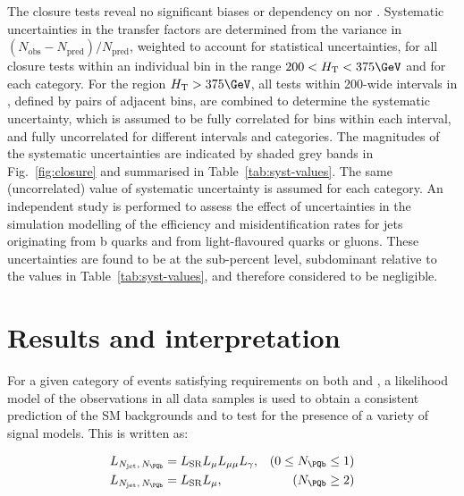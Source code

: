 The closure tests reveal no significant biases or dependency on \njet
nor \scalht. Systematic uncertainties in the transfer factors are
determined from the variance in $(N_\text{obs} -
N_\text{pred})/N_\text{pred}$, weighted to account for statistical
uncertainties, for all closure tests within an individual \scalht bin
in the range $200 < \scalht < 375\GeV$ and for each \njet
category. For the region $\scalht > 375\GeV$, all tests within
200\GeV-wide intervals in \scalht, defined by pairs of adjacent bins,
are combined to determine the systematic uncertainty, which is assumed
to be fully correlated for bins within each interval, and fully
uncorrelated for different \scalht intervals and \njet categories. The
magnitudes of the systematic uncertainties are indicated by shaded
grey bands in Fig.~\ref{fig:closure} and summarised in
Table~\ref{tab:syst-values}. The same (uncorrelated) value of
systematic uncertainty is assumed for each \nb category. An
independent study is performed to assess the effect of uncertainties
in the simulation modelling of the efficiency and misidentification
rates for jets originating from b quarks and from light-flavoured
quarks or gluons. These uncertainties are found to be at the
sub-percent level, subdominant relative to the values in
Table~\ref{tab:syst-values}, and therefore considered to be
negligible.

\section{Results and interpretation\label{sec:results}}

For a given category of events satisfying requirements on both \njet
and \nb, a likelihood model of the observations in all data samples is
used to obtain a consistent prediction of the SM backgrounds and to
test for the presence of a variety of signal models. This is written
as:

\begin{equation}
  \label{likelihood}
  \begin{aligned}
  L_{\njet,\,\nb}  & =  L_\mathrm{SR} L_{\mu} L_{\mu\mu} L_{\gamma}, & (0 \leq \nb \leq 1) \\
  L_{\njet,\,\nb}  & =  L_\mathrm{SR} L_{\mu}, & (\nb \geq 2)
  \end{aligned}
\end{equation}

